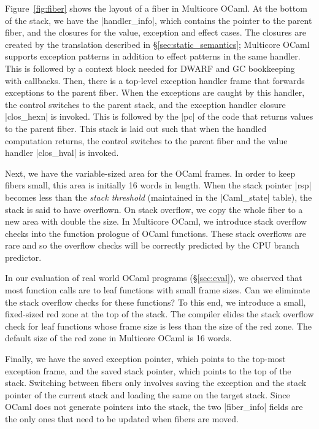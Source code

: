 \documentclass[sigplan,screen]{acmart}
\begin{document}
Figure~\ref{fig:fiber} shows the layout of a fiber in Multicore OCaml. At the
bottom of the stack, we have the |handler_info|, which contains the pointer to
the parent fiber, and the closures for the value, exception and effect cases.
The closures are created by the translation described in
\S\ref{sec:static_semantics}; Multicore OCaml supports exception patterns in
addition to effect patterns in the same handler. This is followed by a context
block needed for DWARF and GC bookkeeping with callbacks. Then, there is a
top-level exception handler frame that forwards exceptions to the parent fiber.
When the exceptions are caught by this handler, the control switches to the
parent stack, and the exception handler closure |clos_hexn| is invoked. This is
followed by the |pc| of the code that returns values to the parent
fiber. This stack is laid out such that when the handled computation returns,
the control switches to the parent fiber and the value handler |clos_hval|
is invoked.

Next, we have the variable-sized area for the OCaml frames. In order to keep
fibers small, this area is initially 16 words in length. When the stack pointer
|rsp| becomes less than the \emph{stack threshold} (maintained in the
|Caml_state| table), the stack is said to have overflown. On stack overflow, we
copy the whole fiber to a new area with double the size. In Multicore OCaml, we
introduce stack overflow checks into the function prologue of OCaml functions.
These stack overflows are rare and so the overflow checks will be correctly predicted
by the CPU branch predictor.

In our evaluation of real world OCaml programs (\S\ref{sec:eval}), we observed
that most function calls are to leaf functions with small frame sizes. Can we
eliminate the stack overflow checks for these functions? To this end, we
introduce a small, fixed-sized red zone at the top of the stack. The compiler
elides the stack overflow check for leaf functions whose frame size is less
than the size of the red zone. The default size of the red zone in Multicore
OCaml is 16 words.

Finally, we have the saved exception pointer, which points to the top-most
exception frame, and the saved stack pointer, which points to the top of the
stack. Switching between fibers only involves saving the exception and the
stack pointer of the current stack and loading the same on the target stack.
Since OCaml does not generate pointers into the stack, the two |fiber_info|
fields are the only ones that need to be updated when fibers are moved.
\end{document}
